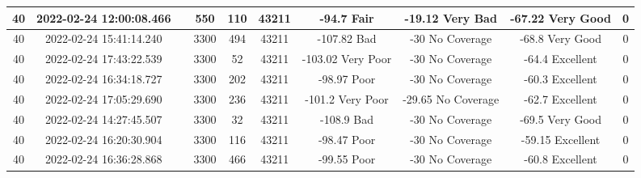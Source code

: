 \begin{longtable*}{|c|c|c|c|c|c|c|c|c|c|}
40&2022-02-24 12:00:08.466&&550&110&43211& -94.7     Fair        & -19.12    Very Bad    & -67.22    Very Good   & 0\\\hline
{}40&2022-02-24 15:41:14.240&&3300&494&43211& -107.82   Bad         & -30       No Coverage & -68.8     Very Good   & 0\\\hline
{}40&2022-02-24 17:43:22.539&&3300&52&43211& -103.02   Very Poor   & -30       No Coverage & -64.4     Excellent   & 0\\\hline
{}40&2022-02-24 16:34:18.727&&3300&202&43211& -98.97    Poor        & -30       No Coverage & -60.3     Excellent   & 0\\\hline
{}40&2022-02-24 17:05:29.690&&3300&236&43211& -101.2    Very Poor   & -29.65    No Coverage & -62.7     Excellent   & 0\\\hline
{}40&2022-02-24 14:27:45.507&&3300&32&43211& -108.9    Bad         & -30       No Coverage & -69.5     Very Good   & 0\\\hline
{}40&2022-02-24 16:20:30.904&&3300&116&43211& -98.47    Poor        & -30       No Coverage & -59.15    Excellent   & 0\\\hline
{}40&2022-02-24 16:36:28.868&&3300&466&43211& -99.55    Poor        & -30       No Coverage & -60.8     Excellent   & 0\\\hline

\end{longtable*}
